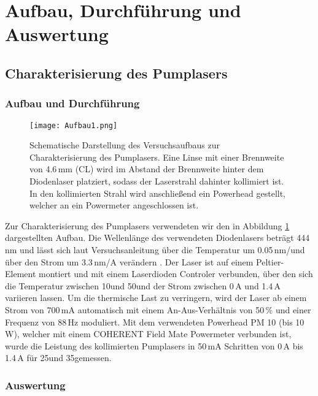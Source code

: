 \section{Aufbau, Durchführung und Auswertung}

\subsection{Charakterisierung des Pumplasers}


\subsubsection{Aufbau und Durchführung}

\begin{figure}[H]
\begin{center}
  \texttt{[image: Aufbau1.png]}
  \caption{Schematische Darstellung des Versuchsaufbaus zur Charakterisierung des Pumplasers. Eine
  Linse mit einer Brennweite von 4.6\,mm (CL) wird im Abstand der Brennweite hinter dem Diodenlaser
  platziert, sodass der Laserstrahl dahinter kollimiert ist. In den kollimierten Strahl wird
  anschließend ein Powerhead gestellt, welcher an ein Powermeter angeschlossen ist.}
  \label{img:aufbau1}
\end{center}
\end{figure}

Zur Charakterisierung des Pumplasers verwendeten wir den in Abbildung \ref{img:aufbau1}
dargestellten Aufbau. Die Wellenlänge des verwendeten Diodenlasers beträgt 444\,nm und lässt sich
laut Versuchsanleitung über die Temperatur um 0.05\,nm/\grad und über den Strom um 3.3\,nm/A
verändern \cite{Versuchsanleitung}. Der Laser ist auf einem Peltier-Element montiert und mit einem
Laserdioden Controler verbunden, über den sich die Temperatur zwischen 10\grad und 50\grad und der Strom zwischen 0\,A und
1.4\,A variieren lassen. Um die thermische Last zu verringern, wird der Laser ab einem Strom von
700\,mA automatisch mit einem An-Aus-Verhältnis von 50\,\% und einer Frequenz von 88\,Hz moduliert.
Mit dem verwendeten Powerhead PM 10 (bis 10\,W), welcher mit einem COHERENT Field Mate Powermeter
verbunden ist, wurde die Leistung des kollimierten Pumplasers in 50\,mA Schritten von 0\,A bis
1.4\,A für 25\grad und 35\grad gemessen.


\subsubsection{Auswertung}


